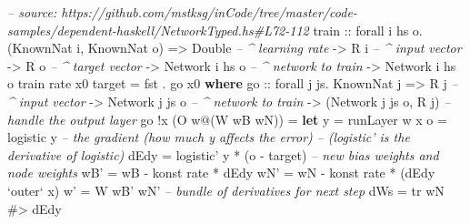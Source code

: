 \documentclass[]{article}
\newenvironment{Shaded}{}{}
\newcommand{\KeywordTok}[1]{\textcolor[rgb]{0.00,0.44,0.13}{\textbf{{#1}}}}
\newcommand{\DataTypeTok}[1]{\textcolor[rgb]{0.56,0.13,0.00}{{#1}}}
\newcommand{\CommentTok}[1]{\textcolor[rgb]{0.38,0.63,0.69}{\textit{{#1}}}}
\newcommand{\OtherTok}[1]{\textcolor[rgb]{0.00,0.44,0.13}{{#1}}}
\newcommand{\FunctionTok}[1]{\textcolor[rgb]{0.02,0.16,0.49}{{#1}}}
\newcommand{\NormalTok}[1]{{#1}}
\begin{document}
\begin{Shaded}
\begin{Highlighting}[]
\CommentTok{-- source: https://github.com/mstksg/inCode/tree/master/code-samples/dependent-haskell/NetworkTyped.hs#L72-112}
\OtherTok{train ::} \NormalTok{forall i hs o}\FunctionTok{.} \NormalTok{(}\DataTypeTok{KnownNat} \NormalTok{i, }\DataTypeTok{KnownNat} \NormalTok{o)}
      \OtherTok{=>} \DataTypeTok{Double}           \CommentTok{-- ^ learning rate}
      \OtherTok{->} \DataTypeTok{R} \NormalTok{i              }\CommentTok{-- ^ input vector}
      \OtherTok{->} \DataTypeTok{R} \NormalTok{o              }\CommentTok{-- ^ target vector}
      \OtherTok{->} \DataTypeTok{Network} \NormalTok{i hs o   }\CommentTok{-- ^ network to train}
      \OtherTok{->} \DataTypeTok{Network} \NormalTok{i hs o}
\NormalTok{train rate x0 target }\FunctionTok{=} \NormalTok{fst }\FunctionTok{.} \NormalTok{go x0}
  \KeywordTok{where}
\OtherTok{    go  ::} \NormalTok{forall j js}\FunctionTok{.} \DataTypeTok{KnownNat} \NormalTok{j}
        \OtherTok{=>} \DataTypeTok{R} \NormalTok{j              }\CommentTok{-- ^ input vector}
        \OtherTok{->} \DataTypeTok{Network} \NormalTok{j js o   }\CommentTok{-- ^ network to train}
        \OtherTok{->} \NormalTok{(}\DataTypeTok{Network} \NormalTok{j js o, }\DataTypeTok{R} \NormalTok{j)}
    \CommentTok{-- handle the output layer}
    \NormalTok{go }\FunctionTok{!}\NormalTok{x (}\DataTypeTok{O} \NormalTok{w}\FunctionTok{@}\NormalTok{(}\DataTypeTok{W} \NormalTok{wB wN))}
        \FunctionTok{=} \KeywordTok{let} \NormalTok{y    }\FunctionTok{=} \NormalTok{runLayer w x}
              \NormalTok{o    }\FunctionTok{=} \NormalTok{logistic y}
              \CommentTok{-- the gradient (how much y affects the error)}
              \CommentTok{--   (logistic' is the derivative of logistic)}
              \NormalTok{dEdy }\FunctionTok{=} \NormalTok{logistic' y }\FunctionTok{*} \NormalTok{(o }\FunctionTok{-} \NormalTok{target)}
              \CommentTok{-- new bias weights and node weights}
              \NormalTok{wB'  }\FunctionTok{=} \NormalTok{wB }\FunctionTok{-} \NormalTok{konst rate }\FunctionTok{*} \NormalTok{dEdy}
              \NormalTok{wN'  }\FunctionTok{=} \NormalTok{wN }\FunctionTok{-} \NormalTok{konst rate }\FunctionTok{*} \NormalTok{(dEdy }\OtherTok{`outer`} \NormalTok{x)}
              \NormalTok{w'   }\FunctionTok{=} \DataTypeTok{W} \NormalTok{wB' wN'}
              \CommentTok{-- bundle of derivatives for next step}
              \NormalTok{dWs  }\FunctionTok{=} \NormalTok{tr wN }\FunctionTok{#>} \NormalTok{dEdy}

\end{Highlighting}
\end{Shaded}
\end{document}
